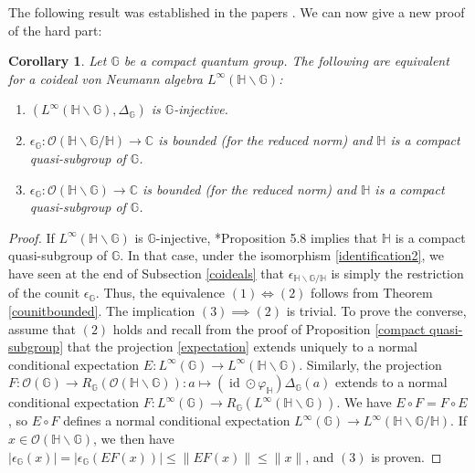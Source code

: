 \documentclass[reqno]{amsart}
\numberwithin{equation}{section}
\newtheorem{Cor}[Theorem]{Corollary}
\DeclareMathOperator{\id}{\mathrm{id}}
\renewcommand{\H}{\mathbb{H}}
\newcommand{\mcO}{\mathcal{O}}
\newcommand{\C}{\mathbb{C}}
\newcommand{\G}{\mathbb{G}}
\begin{document}
The following result was established in the papers \cites{AK24, DR25a}. We can now give a new proof of the hard part:
\begin{Cor} Let $\G$ be a compact quantum group. The following are equivalent for a coideal von Neumann algebra $L^\infty(\H\backslash \G)$:
\begin{enumerate}
    \item $(L^\infty(\H\backslash \G), \Delta_\G)$ is $\G$-injective.
    \item \vspace{-1.5mm} $\epsilon_\G: \mcO(\H\backslash \G/\H)\to \C$ is bounded (for the reduced norm) and $\H$ is a compact quasi-subgroup of $\G$.
     \item\vspace{-1.5mm} $\epsilon_\G: \mcO(\H\backslash \G)\to \C$ is bounded (for the reduced norm) and $\H$ is a compact quasi-subgroup of $\G$.
\end{enumerate}
\end{Cor}
\begin{proof} If $L^\infty(\H\backslash \G)$ is $\G$-injective,  \cite{AK24}*{Proposition 5.8} implies that $\H$  is a compact quasi-subgroup of $\G$. In that case, under the isomorphism \eqref{identification2}, we have seen at the end of Subsection \ref{coideals} that $\epsilon_{\H\backslash \G/\H}$ is simply the restriction of the counit $\epsilon_\G$. Thus, the equivalence $(1) \iff (2)$ follows from Theorem \ref{counitbounded}. The implication $(3)\implies (2)$ is trivial. To prove the converse, assume that $(2)$ holds and recall from the proof of Proposition \ref{compact quasi-subgroup} that the projection \eqref{expectation} extends uniquely to a normal conditional expectation $E: L^\infty(\G)\to L^\infty(\H\backslash \G)$. Similarly, the
projection $F: \mcO(\G)\to R_\G(\mcO(\H\backslash \G)): a \mapsto (\id \odot \varphi_\H)\Delta_\G(a)$ extends to a normal conditional expectation $F: L^\infty(\G)\to R_\G(L^\infty(\H\backslash \G))$. We have $E\circ F = F \circ E$, so $E\circ F$ defines a normal conditional expectation $L^\infty(\G)\to L^\infty(\H\backslash \G/\H)$. If $x\in \mcO(\H\backslash \G)$, we then have
$|\epsilon_\G(x)|=|\epsilon_\G(EF(x))| \le \|EF(x)\| \le \|x\|$, and $(3)$ is proven.
\end{proof}
\end{document}
